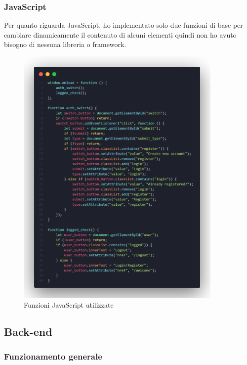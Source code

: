 \documentclass[12pt]{article}
\begin{document}
\subsubsection{JavaScript}

Per quanto riguarda JavaScript, ho implementato solo due funzioni di base per cambiare dinamicamente il contenuto di alcuni elementi quindi non ho avuto bisogno di nessuna libreria o framework.
\begin{figure}[h]
    \includegraphics[width=10cm]{js.png}
    \centering
    \caption{Funzioni JavaScript utilizzate}
    \centering
\end{figure}

\newpage


\subsection{Back-end}

\subsubsection{Funzionamento generale}
\end{document}
